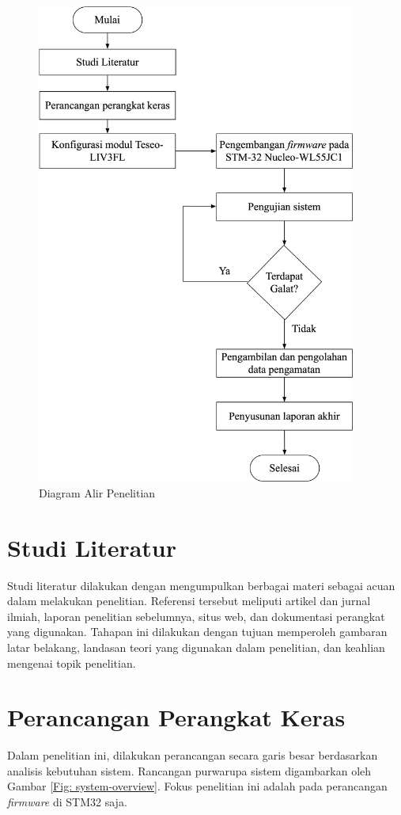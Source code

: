 \begin{figure}[H]
	\centering
	\includegraphics[width=10.5cm]{contents/chapter-3/diagram-alir-penelitian.png}
	\caption{Diagram Alir Penelitian}
	\label{Fig: diagram-alir-penelitian}
\end{figure}

\section{Studi Literatur}
Studi literatur dilakukan dengan mengumpulkan berbagai materi sebagai acuan dalam melakukan penelitian. Referensi tersebut meliputi artikel dan jurnal ilmiah, laporan penelitian sebelumnya, situs web, dan dokumentasi perangkat yang digunakan. Tahapan ini dilakukan dengan tujuan memperoleh gambaran latar belakang, landasan teori yang digunakan dalam penelitian, dan keahlian mengenai topik penelitian.

\section{Perancangan Perangkat Keras}
Dalam penelitian ini, dilakukan perancangan secara garis besar berdasarkan analisis kebutuhan sistem. Rancangan purwarupa sistem digambarkan oleh  Gambar \ref{Fig: system-overview}. Fokus penelitian ini adalah pada perancangan \textit{firmware} di STM32 saja.

